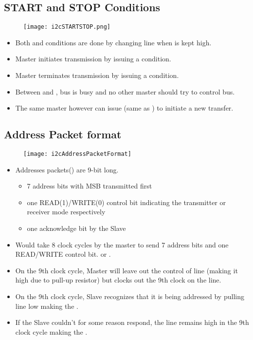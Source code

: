 \subsection{START and STOP Conditions}
\begin{figure}[H]
    \centering
    \texttt{[image: i2cSTARTSTOP.png]}
\end{figure}
\begin{itemize}
	\item Both  and  conditions are done by changing  line when  is kept high.
	\item Master initiates transmission by issuing a  condition.
	\item Master terminates transmission by issuing a  condition.
	\item Between  and , bus is busy and no other master should try to control bus.
	\item The same master however can issue (same as ) to initiate a new transfer.
\end{itemize}

\subsection{Address Packet format}
    \begin{figure}[H]
        \begin{center}
            \texttt{[image: i2cAddressPacketFormat]}
        \end{center}
    \end{figure}
\begin{itemize}
	\item Addresses packets() are 9-bit long.
	\begin{itemize}
		\item 7 address bits with MSB transmitted first
		\item one READ(1)/WRITE(0) control bit indicating the transmitter or receiver mode respectively
		\item one acknowledge bit by the Slave	
	\end{itemize}	
	\item Would take 8 clock cycles by the master to send 7 address bits and one READ/WRITE control bit.  or .
	\item On the 9th clock cycle, Master will leave out the control of  line (making it high due to pull-up resistor) but clocks out the 9th clock on the  line.
	\item On the 9th clock cycle, Slave recognizes that it is being addressed by pulling  line low making the .
	\item If the Slave couldn’t for some reason respond, the  line remains high in the 9th clock cycle making the .
\end{itemize}

